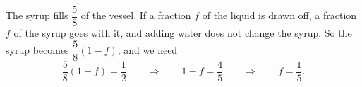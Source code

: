 The syrup fills $\dfrac58$ of the vessel. If a fraction $f$ of the liquid is drawn off, a fraction $f$ of the syrup goes with it, and adding water does not change the syrup. So the syrup becomes $\dfrac58(1-f)$, and we need
\[\dfrac58(1-f)=\dfrac12\qquad\Longrightarrow\qquad1-f=\dfrac45\qquad\Longrightarrow\qquad f=\boxed{\dfrac15}.\]
